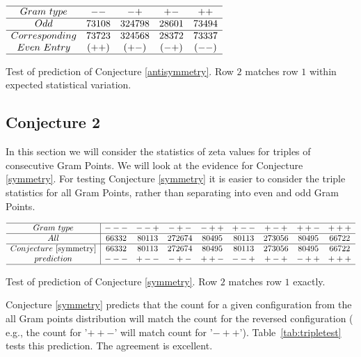 \documentclass[twoside]{article}
\begin{document}
\begin{table}
\centering \(\begin{array}{ccccc}
\hline
 Gram~type&   --   & -+   & +-   & ++  \\
\hline
Odd& 73108& 324798& 28601& 73494 \\
\hline
Corresponding& 73723 & 324568 & 28372& 73337\\ 
Even~Entry     & (++)     & (+-)   & (-+)  & (--) \\
\hline
\end{array}\)
\caption{Test of prediction of Conjecture \ref{antisymmetry}. Row $2$  matches row $1$ within expected statistical variation.} \label{tab:pairtest}
\end{table}


\subsection{\label{sec4b}Conjecture 2}
In this section we will consider the statistics of zeta values for triples of consecutive Gram Points. We will look at the evidence for  Conjecture \ref{symmetry}. For testing Conjecture \ref{symmetry} it is easier to consider the triple statistics for all Gram Points, rather than separating into even and odd Gram Points. 

\begin{table}
\centering \(\begin{array}{c|cccccccc}
\hline
 Gram~type&   ---   & --+       & -+-      & -++   &   +--      & +-+   & ++-   & +++ \\
\hline
All               &  66332&80113& 272674& 80495&80113& 273056& 80495& 66722\\
\hline
Conjecture~\ref{symmetry}&66332&80113& 272674& 80495&80113& 273056& 80495& 66722 \\ 
prediction                            &  ---    & +--    & -+-       & ++-  & --+  & +-+ & -++ & +++  \\
\hline
\end{array}\)
\caption{Test of prediction of Conjecture \ref{symmetry}. Row $2$  matches row $1$ exactly.} \label{tab:tripletest}
\end{table}

Conjecture \ref{symmetry} predicts that the count for a given configuration from the all Gram points distribution  will match the count for the reversed configuration ( e.g., the count for '$++-$' will match count for '$-++$'). Table~\ref{tab:tripletest} tests this prediction. The agreement is excellent.
\end{document}
